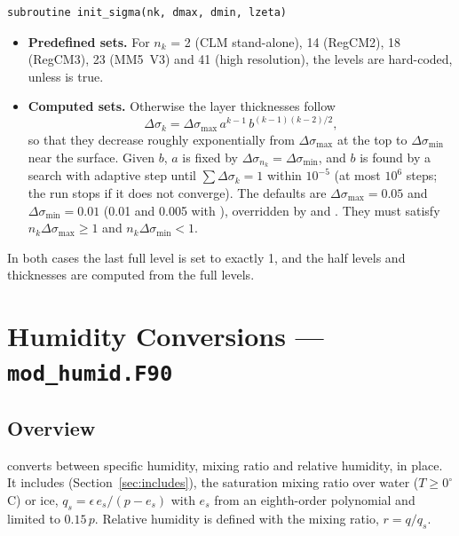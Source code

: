 \begin{lstlisting}
subroutine init_sigma(nk, dmax, dmin, lzeta)
\end{lstlisting}

\begin{itemize}
  \item \textbf{Predefined sets.} For $n_k$ = 2 (CLM stand-alone), 14
        (RegCM2), 18 (RegCM3), 23 (MM5~V3) and 41 (high resolution), the
        levels are hard-coded, unless  is true.
  \item \textbf{Computed sets.} Otherwise the layer thicknesses follow
        \[
          \Delta\sigma_k = \Delta\sigma_{\max}\,a^{k-1}\,b^{(k-1)(k-2)/2},
        \]
        so that they decrease roughly exponentially from
        $\Delta\sigma_{\max}$ at the top to $\Delta\sigma_{\min}$ near the
        surface. Given $b$, $a$ is fixed by
        $\Delta\sigma_{n_k} = \Delta\sigma_{\min}$, and $b$ is found by a
        search with adaptive step until $\sum\Delta\sigma_k = 1$ within
        $10^{-5}$ (at most $10^6$ steps; the run stops if it does not
        converge). The defaults are $\Delta\sigma_{\max} = 0.05$ and
        $\Delta\sigma_{\min} = 0.01$ (0.01 and 0.005 with ),
        overridden by  and . They must satisfy
        $n_k\Delta\sigma_{\max} \ge 1$ and $n_k\Delta\sigma_{\min} < 1$.
\end{itemize}

In both cases the last full level is set to exactly 1, and the half levels
and thicknesses are computed from the full levels.

\section{Humidity Conversions --- \texttt{mod\_humid.F90}}
\label{sec:humid}

\subsection{Overview}

 converts between specific humidity, mixing ratio and
relative humidity, in place. It includes 
(Section~\ref{sec:includes}), the saturation mixing ratio over water
($T \ge 0^\circ$C) or ice, $q_s = \epsilon\,e_s/(p - e_s)$ with $e_s$ from
an eighth-order polynomial and limited to $0.15\,p$. Relative humidity is
defined with the mixing ratio, $r = q/q_s$.

